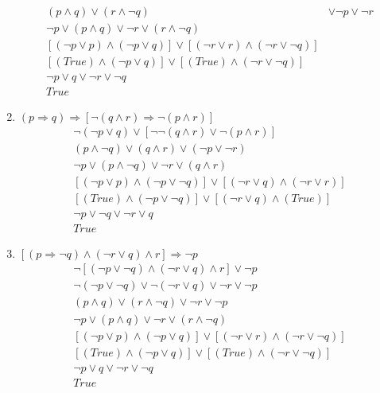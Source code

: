 \documentclass[11pt]{scrartcl}
\begin{document}
\begin{enumerate}[label=\alph*.]
{\begin{align*}
			(p \land q) \lor (r \land \lnot q) & \lor \lnot p \lor \lnot r \tag{De Morgan's Law}\\
			\lnot p \lor (p \land q) \lor \lnot r \lor (r \land \lnot q) \tag{Commutative}\\
			[(\lnot p \lor p) \land (\lnot p \lor q)] \lor [(\lnot r \lor r) \land (\lnot r \lor \lnot q)] \tag{Distributive}\\
			[(True) \land (\lnot p \lor q)] \lor [(True) \land (\lnot r \lor \lnot q)] \tag{Excluded middle}\\
			\lnot p \lor q \lor \lnot r \lor \lnot q \tag{Excluded middle}\\
			True 
		\end{align*}
		}
	\item{
		$(p \Rightarrow q) \Rightarrow [\lnot(q \land r) \Rightarrow \lnot(p \land r)]$	
		\begin{align*}
			\lnot(\lnot p \lor q) \lor [\lnot \lnot(q \land r) \lor \lnot(p \land r)] \tag{De Morgan's Law}\\
			(p \land \lnot q) \lor (q \land r) \lor (\lnot p \lor \lnot r) \tag{De Morgan's Law + Negation}\\
			\lnot p \lor (p \land \lnot q) \lor \lnot r \lor (q \land r) \tag{Commutative}\\
			[(\lnot p \lor p) \land (\lnot p \lor \lnot q)] \lor [(\lnot r \lor q) \land (\lnot r \lor r)] \tag{Distributive}\\
			[(True) \land (\lnot p \lor \lnot q)] \lor [(\lnot r \lor q) \land (True)] \tag{Excluded middle}\\
			\lnot p \lor \lnot q \lor \lnot r \lor q \tag{Excluded middle}\\
			True
		\end{align*}
		}
	\item{
		$[(p \Rightarrow \lnot q) \land (\lnot r \lor q) \land r] \Rightarrow \lnot p$
		\begin{align*}
			\lnot [(\lnot p \lor \lnot q) \land (\lnot r \lor q) \land r] \lor \lnot p \tag{Material Implication}\\
			\lnot (\lnot p \lor \lnot q) \lor \lnot (\lnot r \lor q) \lor \lnot r \lor \lnot p \tag{De Morgan's Law}\\
			(p \land q) \lor (r \land \lnot q) \lor \lnot r \lor \lnot p \tag{De Morgan's Law}\\
			\lnot p \lor (p \land q) \lor \lnot r \lor (r \land \lnot q)  \tag{Commutative}\\
			[(\lnot p \lor p) \land (\lnot p \lor q)] \lor [(\lnot r \lor r) \land (\lnot r \lor \lnot q)] \tag{Distributive}\\
			[(True) \land (\lnot p \lor q)] \lor [(True) \land (\lnot r \lor \lnot q)] \tag{Excluded middle}\\
			\lnot p \lor q \lor \lnot r \lor \lnot q \tag{Excluded middle} \\
			True \tag{Excluded middle} \\
		\end{align*}
		}
\end{enumerate}
\end{document}
